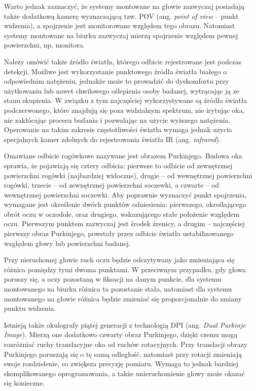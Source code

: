 \documentclass[a4paper,twoside,12pt]{book}
\newcommand{\obcy}[1]{\emph{#1}}
\newcommand{\english}[1]{{\selectlanguage{british}\obcy{#1}}}
\begin{document}
Warto jednak zaznaczyć, że systemy montowane na głowie zazwyczaj posiadają także dodatkową kamerę wyznaczającą tzw. POV (ang. \english{point of view} -- punkt widzenia), a spojrzenie jest monitorowane względem tego obrazu. Natomiast systemy montowane na biurku zazwyczaj mierzą spojrzenie względem pewnej powierzchni, np. monitora.

Należy omówić także źródło światła, którego odbicie rejestrowane jest podczas detekcji. Możliwe jest wykorzystanie punktowego źródła światła białego o odpowiednim natężeniu, jednakże może to prowadzić do dyskomfortu przy użytkowaniu lub nawet chwilowego oślepienia osoby badanej, wytrącając ją ze stanu skupienia. W związku z tym najczęściej wykorzystywane są źródła światła podczerwonego, które znajdują się poza widzialnym spektrum, nie irytując oka, nie zakłócając procesu badania i pozwalając na użycie wyższego natężenia. Operowanie na takim zakresie częstotliwości światła wymaga jednak użycia specjalnych kamer zdolnych do rejestrowania światła IR (ang. \english{infrared}).

Omawiane odbicie rogówkowe nazywane jest obrazem Purkinjego. Budowa oka sprawia, że pojawiają się cztery odbicia: pierwsze to odbicie od zewnętrznej powierzchni rogówki (najbardziej widoczne), drugie -- od wewnętrznej powierzchni rogówki, trzecie -- od zewnętrznej powierzchni soczewki, a czwarte -- od wewnętrznej powierzchni soczewki. Aby poprawnie wyznaczyć punkt spojrzenia, wymagane jest określenie dwóch punktów odniesienia: pierwszego, określającego obrót oczu w oczodole, oraz drugiego, wskazującego stałe położenie względem oczu. Pierwszym punktem zazwyczaj jest środek źrenicy, a drugim -- najczęściej pierwszy obraz Purkinjego, powstały przez odbicie światła ustabilizowanego względem głowy lub powierzchni badanej.

Przy nieruchomej głowie ruch oczu będzie odczytywany jako zmieniająca się różnica pomiędzy tymi dwoma punktami. W przeciwnym przypadku, gdy głowa poruszy się, a oczy pozostaną w fiksacji na danym punkcie, dla systemu montowanego na biurku różnica ta pozostanie stała, natomiast dla systemu montowanego na głowie różnica będzie zmieniać się proporcjonalnie do zmiany punktu widzenia.

Istnieją także okulografy piątej generacji z technologią DPI (ang. \english{Dual Purkinje Image}). Mierzą one dodatkowo czwarty obraz Purkinjego, dzięki czemu mogą rozróżniać ruchy translacyjne oka od ruchów rotacyjnych. Przy translacji obrazy Purkinjego poruszają się o tę samą odległość, natomiast przy rotacji zmieniają swoje rozdzielenie, co zwiększa precyzję pomiaru. Wymaga to jednak bardziej skomplikowanego oprogramowania, a także unieruchomienie głowy może okazać się konieczne.
\end{document}
